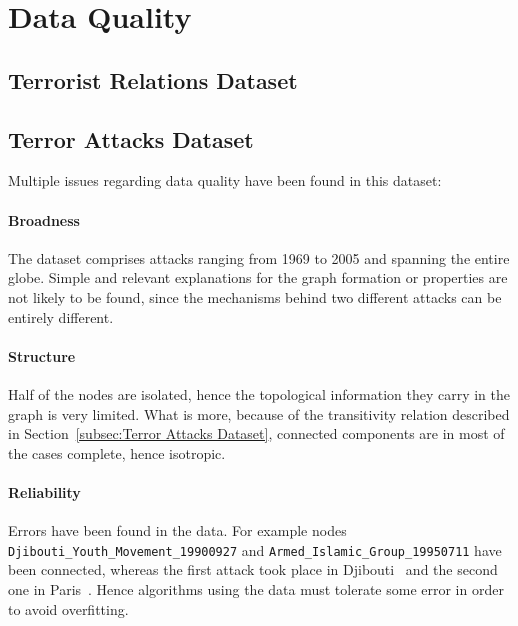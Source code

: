 \section{Data Quality}
\label{sec:DataQuality}

\subsection{Terrorist Relations Dataset}

\subsection{Terror Attacks Dataset}
\label{subsec:terror attack quality}
Multiple issues regarding data quality have been found in this dataset:

\paragraph{Broadness} 
The dataset comprises attacks ranging from 1969 to 2005 and spanning the entire globe. Simple and relevant explanations for the graph formation or properties are not likely to be found, since the mechanisms behind two different attacks can be entirely different.

\paragraph{Structure} 
Half of the nodes are isolated, hence the topological information they carry in the graph is very limited. What is more, because of the transitivity relation described in Section~\ref{subsec:Terror Attacks Dataset}, connected components are in most of the cases complete, hence isotropic. 

\paragraph{Reliability} 
Errors have been found in the data. For example nodes
 \texttt{Djibouti\_Youth\_Movement\_19900927} 
 and 
 \texttt{Armed\_Islamic\_Group\_19950711} 
 have been connected, whereas the first attack took place in Djibouti~\cite{amnesty1991} and the second one in Paris~\cite{nouvelObs2007}. Hence algorithms using the data must tolerate some error in order to avoid overfitting.
